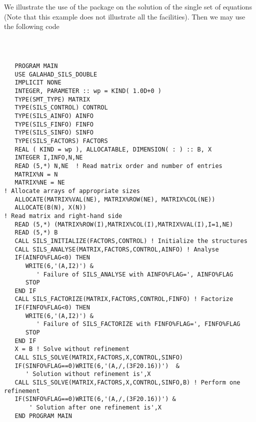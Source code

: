 \documentclass{galahad}
\begin{document}
\galexample
We illustrate the use of the package on the solution of the 
single set of equations 
(Note that this example does not illustrate all the facilities). 
Then we may use the following code
{\tt
\begin{verbatim}

   PROGRAM MAIN 
   USE GALAHAD_SILS_DOUBLE 
   IMPLICIT NONE 
   INTEGER, PARAMETER :: wp = KIND( 1.0D+0 )
   TYPE(SMT_TYPE) MATRIX 
   TYPE(SILS_CONTROL) CONTROL 
   TYPE(SILS_AINFO) AINFO 
   TYPE(SILS_FINFO) FINFO 
   TYPE(SILS_SINFO) SINFO 
   TYPE(SILS_FACTORS) FACTORS 
   REAL ( KIND = wp ), ALLOCATABLE, DIMENSION( : ) :: B, X
   INTEGER I,INFO,N,NE 
   READ (5,*) N,NE  ! Read matrix order and number of entries
   MATRIX%N = N 
   MATRIX%NE = NE 
! Allocate arrays of appropriate sizes 
   ALLOCATE(MATRIX%VAL(NE), MATRIX%ROW(NE), MATRIX%COL(NE)) 
   ALLOCATE(B(N), X(N)) 
! Read matrix and right-hand side                                        
   READ (5,*) (MATRIX%ROW(I),MATRIX%COL(I),MATRIX%VAL(I),I=1,NE)  
   READ (5,*) B  
   CALL SILS_INITIALIZE(FACTORS,CONTROL) ! Initialize the structures 
   CALL SILS_ANALYSE(MATRIX,FACTORS,CONTROL,AINFO) ! Analyse 
   IF(AINFO%FLAG<0) THEN 
      WRITE(6,'(A,I2)') & 
         ' Failure of SILS_ANALYSE with AINFO%FLAG=', AINFO%FLAG 
      STOP 
   END IF 
   CALL SILS_FACTORIZE(MATRIX,FACTORS,CONTROL,FINFO) ! Factorize 
   IF(FINFO%FLAG<0) THEN 
      WRITE(6,'(A,I2)') & 
         ' Failure of SILS_FACTORIZE with FINFO%FLAG=', FINFO%FLAG 
      STOP 
   END IF 
   X = B ! Solve without refinement 
   CALL SILS_SOLVE(MATRIX,FACTORS,X,CONTROL,SINFO) 
   IF(SINFO%FLAG==0)WRITE(6,'(A,/,(3F20.16))')  & 
      ' Solution without refinement is',X 
   CALL SILS_SOLVE(MATRIX,FACTORS,X,CONTROL,SINFO,B) ! Perform one refinement 
   IF(SINFO%FLAG==0)WRITE(6,'(A,/,(3F20.16))') & 
       ' Solution after one refinement is',X 
   END PROGRAM MAIN                                           

\end{verbatim}
}
\end{document}
